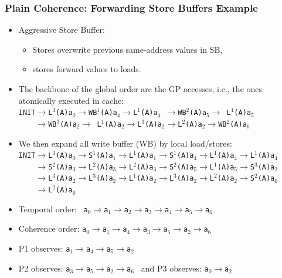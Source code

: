 \documentclass{beamer}
\begin{document}
\begin{frame}[fragile,t]
\frametitle{Plain Coherence: Forwarding Store Buffers Example}

\begin{itemize}
    \item Aggressive Store Buffer:
        \begin{itemize}
            \item Stores overwrite previous same-address values in SB, 
            \item stores forward values to loads.
        \end  {itemize}

    \item The backbone of the global order are the GP accesses, i.e.,
            the ones atomically executed in cache:\\
            {\tt{}INIT$\rightarrow$L$^3$(A)a$_0$$\rightarrow$WB$^1$(A)a$_4$$\rightarrow$L$^1$(A)a$_4$ $\rightarrow$WB$^2$(A)a$_5$$\rightarrow$ L$^1$(A)a$_5$}\\
            {\tt~~~~$\rightarrow$WB$^3$(A)a$_2$$\rightarrow$ L$^1$(A)a$_2$$\rightarrow$L$^3$(A)a$_2$$\rightarrow$L$^2$(A)a$_2$$\rightarrow$WB$^2$(A)a$_6$}\medskip

    \item We then expand all write buffer (WB) by local load/stores:\\
           {\tt{}INIT$\rightarrow$L$^3$(A)a$_0$$\rightarrow$S$^1$(A)a$_1$$\rightarrow$L$^1$(A)a$_1$$\rightarrow$S$^1$(A)a$_4$$\rightarrow$L$^1$(A)a$_4$$\rightarrow$L$^1$(A)a$_4$}\\
           {\tt~~~~$\rightarrow$S$^2$(A)a$_3$$\rightarrow$L$^2$(A)a$_3$$\rightarrow$L$^2$(A)a$_3$$\rightarrow$S$^2$(A)a$_5$$\rightarrow$L$^1$(A)a$_5$$\rightarrow$S$^3$(A)a$_2$}\\
           {\tt~~~~$\rightarrow$L$^3$(A)a$_2$$\rightarrow$L$^3$(A)a$_2$$\rightarrow$L$^1$(A)a$_2$$\rightarrow$L$^3$(A)a$_2$$\rightarrow$L$^2$(A)a$_2$$\rightarrow$S$^2$(A)a$_6$}\\ 
           {\tt~~~~$\rightarrow$L$^2$(A)a$_6$}\medskip

    \item Temporal order: {\tt~a$_0\rightarrow$a$_1\rightarrow$a$_2\rightarrow$a$_3\rightarrow$a$_4\rightarrow$a$_5\rightarrow$a$_6$}
    \item Coherence order: {\tt a$_0\rightarrow$a$_1\rightarrow$a$_4\rightarrow$a$_3\rightarrow$a$_5\rightarrow$a$_2\rightarrow$a$_6$}
    \item P1 observes: {\tt a$_1\rightarrow$a$_4\rightarrow$a$_5\rightarrow$a$_2$}
    \item P2 observes: {\tt a$_3\rightarrow$a$_5\rightarrow$a$_2\rightarrow$a$_6$~} and 
    P3 observes: {\tt a$_0\rightarrow$a$_2$}

\end{itemize}


\end{frame}
\end{document}
